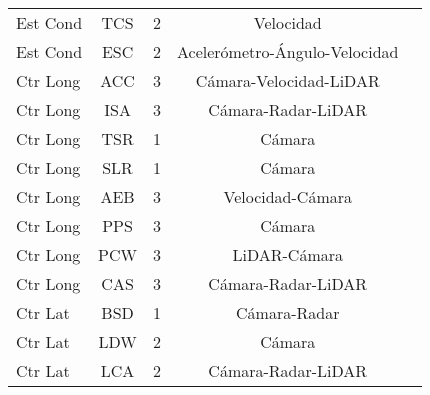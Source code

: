 \begin{table}[H]
\begin{tabular}{|l|c|c|c|c|}
Est Cond                      & TCS                       & 2                                                                                  & Velocidad    \\ 
Est Cond                      & ESC                       & 2                                                                                   & Acelerómetro-Ángulo-Velocidad           \\ 
Ctr Long                      & ACC                       & 3                                                                                   & Cámara-Velocidad-LiDAR          \\ 
Ctr Long                      & ISA                       & 3                                                                                   & Cámara-Radar-LiDAR          \\ 
Ctr Long                      & TSR                       & 1                                                                                  &   Cámara          \\
Ctr Long                      & SLR                       & 1                                                                                   &  Cámara         \\ 
Ctr Long                      & AEB                       & 3                                                                                   &     Velocidad-Cámara        \\ 
Ctr Long                      & PPS                       & 3                                                                                   &   Cámara        \\ 
Ctr Long                      & PCW                       &  3                                                                                  &     LiDAR-Cámara        \\ 
Ctr Long                      & CAS                       &  3                                                                                  &     Cámara-Radar-LiDAR        \\ 
Ctr Lat                       & BSD                       & 1                                                                                   &     Cámara-Radar     \\ 
Ctr Lat                       & LDW                       & 2                                                                                    &     Cámara     \\ 
Ctr Lat                       & LCA                       & 2                                                                                   &     Cámara-Radar-LiDAR     \\ 

\end{tabular}
\end{table}
